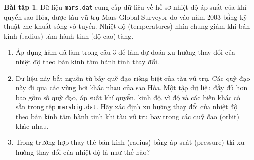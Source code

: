 \documentclass[12pt,xcolor=dvipsnames]{article}
\date{}
\theoremstyle{definition}
\newtheorem{bt}{Bài tập}
\begin{document}
\begin{bt}
Dữ liệu \texttt{mars.dat} cung cấp dữ liệu về hồ sơ nhiệt độ-áp suất của khí quyển sao Hỏa, được tàu vũ trụ Mars Global Surveyor đo vào năm 2003 bằng kỹ thuật che khuất sóng vô tuyến. Nhiệt độ (temperatures) nhìn chung giảm khi bán kính (radius) tâm hành tinh (độ cao) tăng.

\begin{enumerate}[label=(\alph*)]
    \item Áp dụng hàm đã làm trong câu 3 để làm dự đoán xu hướng thay đổi của nhiệt độ theo bán kính tâm hành tinh thay đổi.
    \item Dữ liệu này bắt nguồn từ bảy quỹ đạo riêng biệt của tàu vũ trụ. Các quỹ đạo này đi qua các vùng hơi khác nhau của sao Hỏa. Một tập dữ liệu đầy đủ hơn bao gồm số quỹ đạo, áp suất khí quyển, kinh độ, vĩ độ và các biến khác có sẵn trong tệp \texttt{marsbig.dat}. Hãy xác định xu hướng thay đổi của nhiệt độ theo bán kính tâm hành tinh khi tàu vũ trụ bay trong các quỹ đạo (orbit) khác nhau.
    \item Trong trường hợp thay thế bán kính (radius) bằng áp suất (pressure) thì xu hướng thay đổi của nhiệt độ là như thế nào?
\end{enumerate}
\end{bt}
\end{document}

